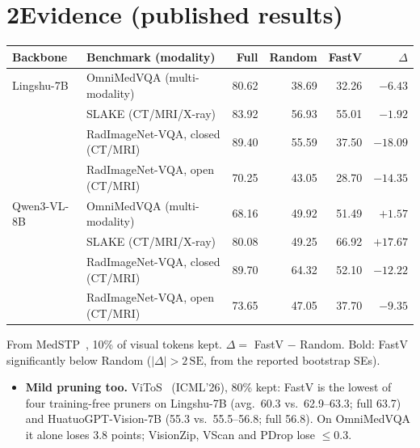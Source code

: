 \documentclass[11pt]{article}
\begin{document}
\section*{2\quad Evidence (published results)}
\begin{center}\small
\begin{tabular}{@{}llrrrr@{}}
\toprule
Backbone & Benchmark (modality) & Full & Random & FastV & $\Delta$ \\
\midrule
Lingshu-7B  & OmniMedVQA (multi-modality)       & 80.62 & 38.69 & 32.26 & $\mathbf{-6.43}$  \\
            & SLAKE (CT/MRI/X-ray)              & 83.92 & 56.93 & 55.01 & $-1.92$           \\
            & RadImageNet-VQA, closed (CT/MRI)  & 89.40 & 55.59 & 37.50 & $\mathbf{-18.09}$ \\
            & RadImageNet-VQA, open (CT/MRI)    & 70.25 & 43.05 & 28.70 & $\mathbf{-14.35}$ \\
\midrule
Qwen3-VL-8B & OmniMedVQA (multi-modality)       & 68.16 & 49.92 & 51.49 & $+1.57$           \\
            & SLAKE (CT/MRI/X-ray)              & 80.08 & 49.25 & 66.92 & $+17.67$          \\
            & RadImageNet-VQA, closed (CT/MRI)  & 89.70 & 64.32 & 52.10 & $\mathbf{-12.22}$ \\
            & RadImageNet-VQA, open (CT/MRI)    & 73.65 & 47.05 & 37.70 & $\mathbf{-9.35}$  \\
\bottomrule
\end{tabular}

\vspace{2pt}
{\footnotesize From MedSTP~\cite{medstp}, 10\% of visual tokens kept. $\Delta=$ FastV $-$ Random.
Bold: FastV significantly below Random ($|\Delta|>2\,\mathrm{SE}$, from the reported bootstrap SEs).}
\end{center}

\begin{itemize}
  \item \textbf{Mild pruning too.} ViToS~\cite{vitos} (ICML'26), 80\% kept: FastV is the lowest
        of four training-free pruners on Lingshu-7B (avg.\ 60.3 vs.\ 62.9--63.3; full 63.7) and
        HuatuoGPT-Vision-7B (55.3 vs.\ 55.5--56.8; full 56.8). On OmniMedVQA it alone loses
        3.8 points; VisionZip, VScan and PDrop lose $\le 0.3$.
\end{itemize}

\end{document}
